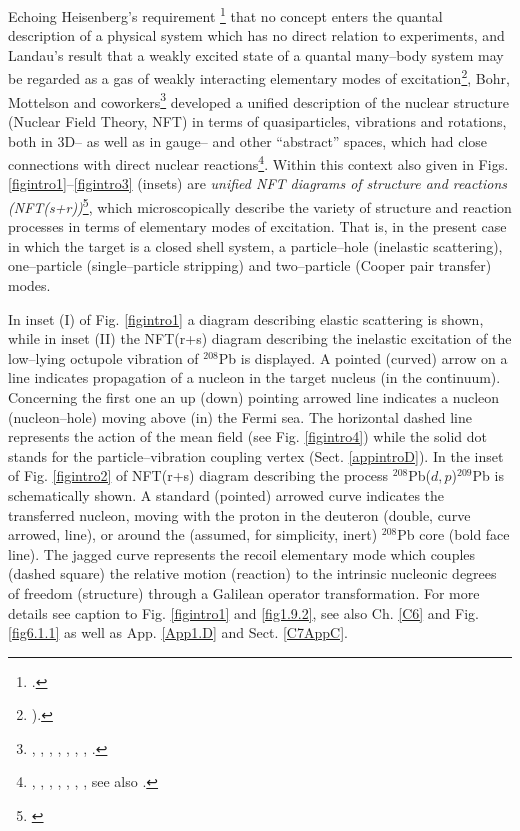 Echoing Heisenberg's requirement \footnote{\cite{Heisenberg:49}.} that no concept enters the quantal description of a physical system which has no direct relation to experiments, and Landau's result that a weakly excited state of a quantal many--body system may be regarded as a gas of weakly interacting elementary modes of excitation\footnote{\cite{Landau:41}).}, Bohr, Mottelson and coworkers\footnote{\cite{Bohr:69}, \cite{Bohr:76}, \cite{Mottelson:76}, \cite{Bohr:75}, \cite{Bohr:58}, \cite{Belyaev:59}, \cite{Nilsson:55},  \cite{Bes:66}.} developed a unified description of the nuclear  structure (Nuclear Field Theory, NFT) in terms of quasiparticles, vibrations and rotations, both in 3D-- as well as in gauge-- and other ``abstract'' spaces, which had  close connections with direct nuclear reactions\footnote{ \cite{Alder:56}, \cite{Alder:75}, \cite{Broglia:04a}, \cite{Austern:70}, \cite{Glendenning:04}, \cite{Satchler:80}, \cite{Satchler:83}, see also \cite{Potel:13}.}. Within this context also given in Figs. \ref{figintro1}--\ref{figintro3} (insets) are \textit{unified NFT diagrams of structure and reactions (NFT(s+r))}\footnote{ \cite{Broglia:75,Broglia:04a,Potel:13,Broglia:16}}, which microscopically describe the variety of structure and reaction processes in terms of elementary modes of excitation. That is, in the present case in which the target is a closed shell system, a particle--hole (inelastic scattering), one--particle (single--particle stripping) and two--particle (Cooper pair transfer) modes.

In inset (I) of Fig. \ref{figintro1} a diagram describing elastic scattering is shown, while in inset (II) the NFT(r+s) diagram describing the inelastic excitation of the low--lying octupole vibration of $^{208}$Pb is displayed. A pointed (curved) arrow on a line indicates propagation of a nucleon in the target nucleus (in the continuum). Concerning the first one an up (down) pointing arrowed line indicates a nucleon (nucleon--hole) moving above (in) the Fermi sea. The horizontal dashed line represents the action of the mean field (see Fig. \ref{figintro4}) while the solid dot stands for the particle--vibration coupling vertex (Sect. \ref{appintroD}). In the inset of Fig. \ref{figintro2} of NFT(r+s) diagram describing the process $^{208}$Pb($d,p$)$^{209}$Pb is schematically shown. A standard (pointed) arrowed curve indicates the transferred nucleon, moving with the proton in the deuteron (double, curve arrowed, line), or around the (assumed, for simplicity, inert) $^{208}$Pb core (bold face line). The jagged curve represents the recoil elementary mode which couples (dashed square) the relative motion (reaction) to the intrinsic nucleonic degrees of freedom  (structure) through a Galilean operator transformation. For more details see caption to Fig. \ref{figintro1} and \ref{fig1.9.2}, see also Ch. \ref{C6} and Fig. \ref{fig6.1.1} as well as App. \ref{App1.D} and Sect. \ref{C7AppC}.


